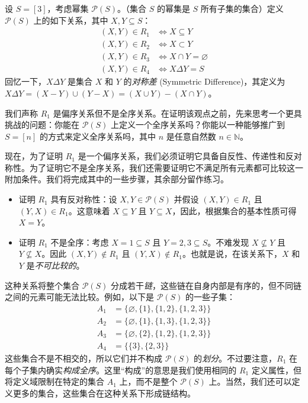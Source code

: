 \begin{example}
    设 $S=[3]$，考虑幂集 $\mathcal{P}(S)$。（集合 $S$ 的幂集是 $S$ 所有子集的集合）定义 $\mathcal{P}(S)$ 上的如下关系，其中 $X, Y \subseteq S$：
    \begin{align*}
        (X, Y) \in R_1 &\iff X \subseteq Y \\
        (X, Y) \in R_2 &\iff X \subset Y \\
        (X, Y) \in R_3 &\iff X \cap Y = \varnothing \\
        (X, Y) \in R_4 &\iff X \Delta Y = S
    \end{align*}
    回忆一下，$X \Delta Y$ 是集合 $X$ 和 $Y$ 的\emph{对称差} (Symmetric Difference)，其定义为 $X \Delta Y = (X - Y) \cup (Y - X) = (X \cup Y) - (X \cap Y)$。

    我们声称 $R_1$ 是偏序关系但不是全序关系。在证明该观点之前，先来思考一个更具挑战的问题：你能在 $\mathcal{P}(S)$ 上定义一个全序关系吗？你能以一种能够推广到 $S = [n]$ 的方式来定义全序关系吗，其中 $n$ 是任意自然数 $n \in \mathbb{N}$。

    现在，为了证明 $R_1$ 是一个偏序关系，我们必须证明它具备自反性、传递性和反对称性。为了证明它不是全序关系，我们还需要证明它不满足所有元素都可比较这一附加条件。我们将完成其中的一些步骤，其余部分留作练习。

    \begin{itemize}
        \item 证明 $R_1$ 具有反对称性：设 $X, Y \in \mathcal{P}(S)$ 并假设 $(X,Y) \in R_1$ 且 $(Y,X) \in R_1$。这意味着 $X \subseteq Y$ 且 $Y \subseteq X$，因此，根据集合的基本性质可得 $X=Y$。
        \item 证明 $R_1$ 不是全序：考虑 $X = {1} \subseteq S$ 且 $Y = {2, 3} \subseteq S$。不难发现 $X \nsubseteq Y$ 且 $Y \nsubseteq X$。因此 $(X,Y) \notin R_1$ 且 $(Y,X) \notin R_1$。也就是说，在该关系下，$X$ 和 $Y$ 是\emph{不可比较的}。
    \end{itemize}
\end{example}

这种关系将整个集合 $\mathcal{P}(S)$ 分成若干\emph{链}，这些链在自身内部是有序的，但不同链之间的元素可能无法比较。例如，以下是 $\mathcal{P}(S)$ 的一些子集：
    \begin{align*}
        A_1 &= \big\{\varnothing, \{1\} , \{1, 2\} , \{1, 2, 3\}\big\} \\
        A_2 &= \big\{\varnothing, \{1\} , \{1, 3\} , \{1, 2, 3\}\big\} \\
	    A_3 &= \big\{\varnothing, \{2\} , \{1, 2\} , \{1, 2, 3\}\big\} \\
        A_4 &= \big\{\{3\} , \{2, 3\}\big\}
    \end{align*}
这些集合不是不相交的，所以它们并不构成 $\mathcal{P}(S)$ 的\emph{划分}。不过要注意，$R_1$ 在每个子集内确实\emph{构成全序}。这里``构成''的意思是我们使用相同的 $R_1$ 定义属性，但将定义域限制在特定的集合 $A_1$ 上，而不是整个 $\mathcal{P}(S)$ 上。当然，我们还可以定义更多的集合，这些集合在这种关系下形成链结构。

